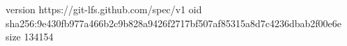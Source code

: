 version https://git-lfs.github.com/spec/v1
oid sha256:9e430fb977a466b2c9b828a9426f2717bf507af85315a8d7c4236dbab2f00e6e
size 134154
